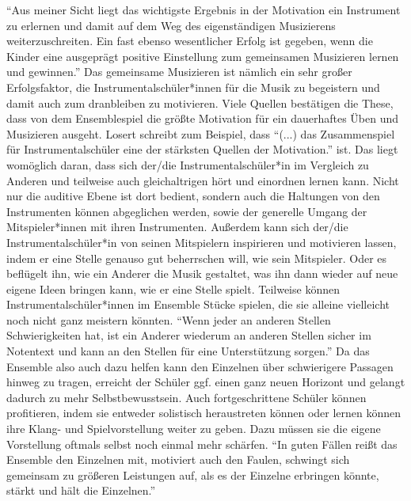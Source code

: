 \enquote{Aus meiner Sicht liegt das wichtigste Ergebnis in der Motivation ein Instrument
zu erlernen und damit auf dem Weg des eigenständigen Musizierens
weiterzuschreiten. Ein fast ebenso wesentlicher Erfolg ist gegeben, wenn die
Kinder eine ausgeprägt positive Einstellung zum gemeinsamen Musizieren lernen
und gewinnen.}\autocite[40]{ernst:die_zukunftsfaehige_musikschule} Das
gemeinsame Musizieren ist nämlich ein sehr großer Erfolgsfaktor, die
Instrumentalschüler*innen für die Musik zu begeistern und damit auch zum dranbleiben
zu motivieren. Viele Quellen bestätigen die These, dass von dem Ensemblespiel
die größte Motivation für ein dauerhaftes Üben und Musizieren ausgeht.
Losert schreibt zum Beispiel, dass \enquote{(...) das Zusammenspiel für Instrumentalschüler eine der
stärksten Quellen der Motivation.} ist. \autocite[92]{losert:die_kunst_zu_unterrichten}
Das liegt womöglich daran, dass sich der/die Instrumentalschüler*in im Vergleich zu
Anderen und teilweise auch gleichaltrigen hört und einordnen lernen kann. Nicht
nur die auditive Ebene ist dort bedient, sondern auch die Haltungen von den
Instrumenten können abgeglichen werden, sowie der generelle Umgang der
Mitspieler*innen mit ihren Instrumenten. Außerdem kann sich der/die Instrumentalschüler*in
von seinen Mitspielern inspirieren und motivieren lassen, indem er eine Stelle
genauso gut beherrschen will, wie sein Mitspieler. Oder es beflügelt ihn, wie
ein Anderer die Musik gestaltet, was ihn dann wieder auf neue eigene Ideen
bringen kann, wie er eine Stelle spielt. Teilweise können Instrumentalschüler*innen im
Ensemble Stücke spielen, die sie alleine vielleicht noch nicht ganz meistern
könnten. \enquote{Wenn jeder an anderen Stellen Schwierigkeiten hat, ist ein Anderer
wiederum an anderen Stellen sicher im Notentext und kann an den Stellen für eine
Unterstützung sorgen.}
\autocite[32]{losert:die_kunst_zu_unterrichten}
Da das Ensemble also auch dazu helfen kann den Einzelnen über schwierigere
Passagen hinweg zu tragen, erreicht der Schüler ggf. einen ganz neuen Horizont
und gelangt dadurch zu mehr Selbstbewusstsein. Auch fortgeschrittene
Schüler können profitieren, indem sie entweder solistisch heraustreten können
oder lernen können ihre Klang- und Spielvorstellung weiter zu geben. Dazu müssen
sie die eigene Vorstellung oftmals selbst noch einmal mehr schärfen. \enquote{In guten
Fällen reißt das Ensemble den Einzelnen mit, motiviert auch den Faulen, schwingt
sich gemeinsam zu größeren Leistungen auf, als es der Einzelne erbringen könnte,
stärkt und hält die Einzelnen.} \autocite[94]{mitzscherlich:musikpsychologie}
